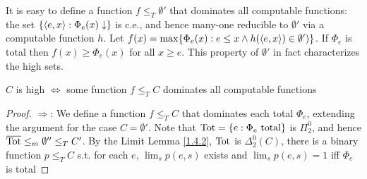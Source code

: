 \documentclass[11pt]{article}
\begin{document}
It is easy to define a function \(f\le_T\emptyset'\) that dominates all computable functions: the
set \(\{\langle e,x\rangle:\Phi_e(x)\downarrow\}\) is c.e., and hence many-one reducible to \(\emptyset'\) via a computable
function \(h\). Let \(f(x)=\max\{\Phi_e(x):e\le x\wedge h(\langle e,x\rangle)\in\emptyset')\}\). If \(\Phi_e\) is total
then \(f(x)\ge\Phi_e(x)\) for all \(x\ge e\). This property of \(\emptyset'\) in fact characterizes the high
sets.

\begin{theorem}[]
\(C\) is high \(\Leftrightarrow\) some function \(f\le_TC\) dominates all computable functions
\end{theorem}

\begin{proof}
\(\Rightarrow\): We define a function \(f\le_TC\) that dominates each total \(\Phi_e\), extending the argument
for the case \(C=\emptyset'\). Note that \(\operatorname{Tot}=\{e:\Phi_e\text{ total}\}\) is \(\Pi_2^0\), and
hence \(\overline{\operatorname{Tot}}\le_m\emptyset''\le_TC'\). By the Limit Lemma \ref{1.4.2}, \(\operatorname{Tot}\) is \(\Delta_2^0(C)\), there is
a binary function \(p\le_TC\) s.t. for each \(e\), \(\lim_sp(e,s)\) exists and \(\lim_sp(e,s)=1\)
iff \(\Phi_e\) is total
\end{proof}
\end{document}
